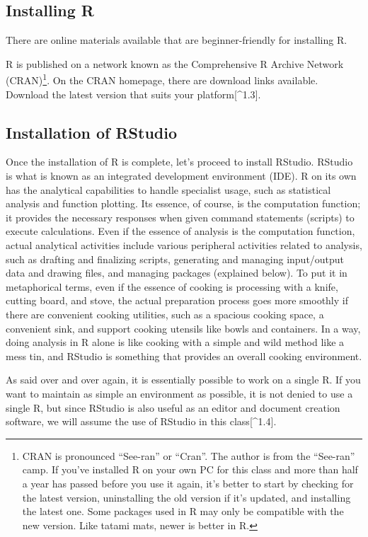\documentclass[
  a4paper,
]{book}
\begin{document}
\subsection{Installing R}\label{installing-r}

There are online materials available that are beginner-friendly for
installing R.

R is published on a network known as the Comprehensive R Archive Network
(CRAN)\footnote{CRAN is pronounced ``See-ran'' or ``Cran''. The author
  is from the ``See-ran'' camp. If you've installed R on your own PC for
  this class and more than half a year has passed before you use it
  again, it's better to start by checking for the latest version,
  uninstalling the old version if it's updated, and installing the
  latest one. Some packages used in R may only be compatible with the
  new version. Like tatami mats, newer is better in R.}. On the CRAN
homepage, there are download links available. Download the latest
version that suits your platform{[}\^{}1.3{]}.

\subsection{Installation of RStudio}\label{installation-of-rstudio}

Once the installation of R is complete, let's proceed to install
RStudio. RStudio is what is known as an integrated development
environment (IDE). R on its own has the analytical capabilities to
handle specialist usage, such as statistical analysis and function
plotting. Its essence, of course, is the computation function; it
provides the necessary responses when given command statements (scripts)
to execute calculations. Even if the essence of analysis is the
computation function, actual analytical activities include various
peripheral activities related to analysis, such as drafting and
finalizing scripts, generating and managing input/output data and
drawing files, and managing packages (explained below). To put it in
metaphorical terms, even if the essence of cooking is processing with a
knife, cutting board, and stove, the actual preparation process goes
more smoothly if there are convenient cooking utilities, such as a
spacious cooking space, a convenient sink, and support cooking utensils
like bowls and containers. In a way, doing analysis in R alone is like
cooking with a simple and wild method like a mess tin, and RStudio is
something that provides an overall cooking environment.

As said over and over again, it is essentially possible to work on a
single R. If you want to maintain as simple an environment as possible,
it is not denied to use a single R, but since RStudio is also useful as
an editor and document creation software, we will assume the use of
RStudio in this class{[}\^{}1.4{]}.
\end{document}
